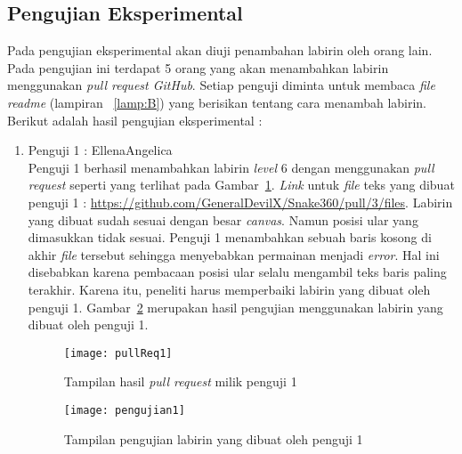\subsection{Pengujian Eksperimental}
Pada pengujian eksperimental akan diuji penambahan labirin oleh orang lain. Pada pengujian ini terdapat 5 orang yang akan menambahkan labirin menggunakan \textit{pull request GitHub}. Setiap penguji diminta untuk membaca \textit{file} \textit{readme} (lampiran ~\ref{lamp:B}) yang berisikan tentang cara menambah labirin. Berikut adalah hasil pengujian eksperimental : 

\begin{enumerate}
	\item Penguji 1 : EllenaAngelica\\
	Penguji 1 berhasil menambahkan labirin \textit{level} 6 dengan menggunakan \textit{pull request} seperti yang terlihat pada Gambar~\ref{fig:pullReq1}. \textit{Link} untuk \textit{file} teks yang dibuat penguji 1 :  \url{https://github.com/GeneralDevilX/Snake360/pull/3/files}. Labirin yang dibuat sudah sesuai dengan besar \textit{canvas}. Namun posisi ular yang dimasukkan tidak sesuai. Penguji 1 menambahkan sebuah baris kosong di akhir \textit{file} tersebut sehingga menyebabkan permainan menjadi \textit{error}. Hal ini disebabkan karena pembacaan posisi ular selalu mengambil teks baris paling terakhir. Karena itu, peneliti harus memperbaiki labirin yang dibuat oleh penguji 1. Gambar~\ref{fig:pengujian1} merupakan hasil pengujian menggunakan labirin yang dibuat oleh penguji 1. 
	
	\begin{figure}[H]
		\centering  
		\texttt{[image: pullReq1]}  
		\caption[Tampilan hasil \textit{pull request} milik penguji 1]{Tampilan hasil \textit{pull request} milik penguji 1}
		\label{fig:pullReq1} 
	\end{figure}
	
	\begin{figure}[H]
		\centering  
		\texttt{[image: pengujian1]}  
		\caption[Tampilan pengujian labirin yang dibuat oleh penguji 1]{Tampilan pengujian labirin yang dibuat oleh penguji 1}
		\label{fig:pengujian1} 
	\end{figure}	
	

\end{enumerate}
